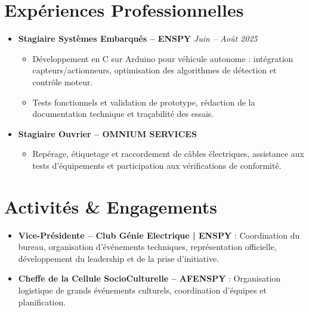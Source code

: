 \documentclass[a4paper,11pt]{article}
\begin{document}
\begin{itemize}[leftmargin=*, label={-}, itemsep=1pt]
\end{itemize}

\vspace{1pt}

\section{Expériences Professionnelles}
\begin{itemize}[leftmargin=*, label={-}, itemsep=1pt]

\item \textbf{Stagiaire Systèmes Embarqués -- ENSPY} \hfill \textit{Juin -- Août 2025}
\vspace{-2pt}
    \begin{itemize}[leftmargin=0.4cm, nosep, label=\tiny$\bullet$]
        \item \small{Développement en C sur Arduino pour véhicule autonome : intégration capteurs/actionneurs, optimisation des algorithmes de détection et contrôle moteur.}
        \item \small{Tests fonctionnels et validation de prototype, rédaction de la documentation technique et traçabilité des essais.}
    \end{itemize}

\item \textbf{Stagiaire Ouvrier -- OMNIUM SERVICES}
\vspace{-2pt}
    \begin{itemize}[leftmargin=0.4cm, nosep, label=\tiny$\bullet$]
        \item \small{Repérage, étiquetage et raccordement de câbles électriques, assistance aux tests d'équipements et participation aux vérifications de conformité.}
    \end{itemize}

\end{itemize}

\vspace{1pt}

\section{Activités \& Engagements}
\begin{itemize}[leftmargin=*, nosep, label={-}]
    \item \small{\textbf{Vice-Présidente -- Club Génie Electrique | ENSPY} : Coordination du bureau, organisation d'événements techniques, représentation officielle, développement du leadership et de la prise d'initiative.}
    \item \small{\textbf{Cheffe de la Cellule SocioCulturelle -- AFENSPY} : Organisation logistique de grands événements culturels, coordination d'équipes et planification.}
\end{itemize}
\end{document}
